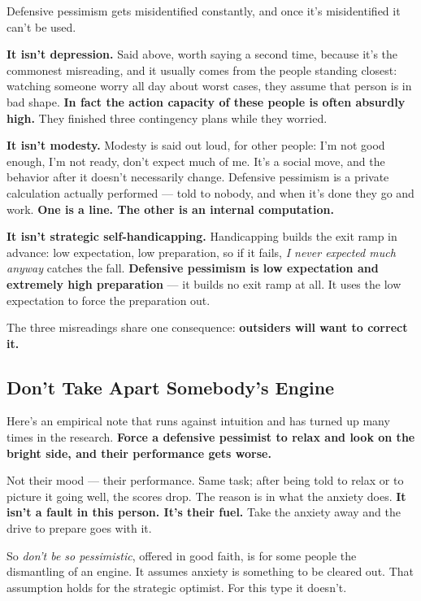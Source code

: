 \documentclass[11pt,a4paper]{article}
\begin{document}
Defensive pessimism gets misidentified constantly, and once it's misidentified it can't be used.

\textbf{It isn't depression.} Said above, worth saying a second time, because it's the commonest misreading, and it usually comes from the people standing closest: watching someone worry all day about worst cases, they assume that person is in bad shape. \textbf{In fact the action capacity of these people is often absurdly high.} They finished three contingency plans while they worried.

\textbf{It isn't modesty.} Modesty is said out loud, for other people: I'm not good enough, I'm not ready, don't expect much of me. It's a social move, and the behavior after it doesn't necessarily change. Defensive pessimism is a private calculation actually performed --- told to nobody, and when it's done they go and work. \textbf{One is a line. The other is an internal computation.}

\textbf{It isn't strategic self-handicapping.} Handicapping builds the exit ramp in advance: low expectation, low preparation, so if it fails, \textit{I never expected much anyway} catches the fall. \textbf{Defensive pessimism is low expectation and extremely high preparation} --- it builds no exit ramp at all. It uses the low expectation to force the preparation out.

The three misreadings share one consequence: \textbf{outsiders will want to correct it.}

\subsection{Don't Take Apart Somebody's Engine}

Here's an empirical note that runs against intuition and has turned up many times in the research. \textbf{Force a defensive pessimist to relax and look on the bright side, and their performance gets worse.}

Not their mood --- their performance. Same task; after being told to relax or to picture it going well, the scores drop. The reason is in what the anxiety does. \textbf{It isn't a fault in this person. It's their fuel.} Take the anxiety away and the drive to prepare goes with it.

So \textit{don't be so pessimistic}, offered in good faith, is for some people the dismantling of an engine. It assumes anxiety is something to be cleared out. That assumption holds for the strategic optimist. For this type it doesn't.
\end{document}
